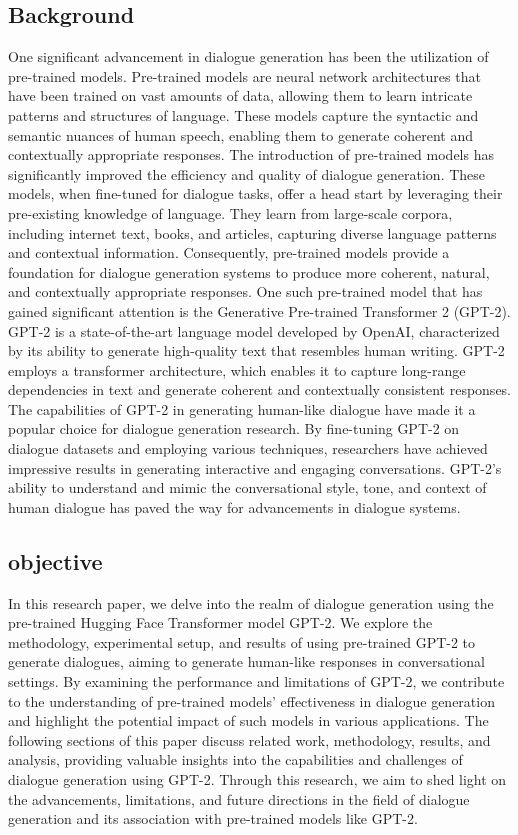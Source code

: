 \documentclass[12pt]{IEEEtran}
\begin{document}
\subsection{Background}
One significant advancement in dialogue generation has been the utilization of pre-trained models. Pre-trained models are neural network architectures that have been trained on vast amounts of data, allowing them to learn intricate patterns and structures of language. These models capture the syntactic and semantic nuances of human speech, enabling them to generate coherent and contextually appropriate responses. The introduction of pre-trained models has significantly improved the efficiency and quality of dialogue generation. These models, when fine-tuned for dialogue tasks, offer a head start by leveraging their pre-existing knowledge of language. They learn from large-scale corpora, including internet text, books, and articles, capturing diverse language patterns and contextual information. Consequently, pre-trained models provide a foundation for dialogue generation systems to produce more coherent, natural, and contextually appropriate responses.
One such pre-trained model that has gained significant attention is the Generative Pre-trained Transformer 2 (GPT-2). GPT-2 is a state-of-the-art language model developed by OpenAI, characterized by its ability to generate high-quality text that resembles human writing. GPT-2 employs a transformer architecture, which enables it to capture long-range dependencies in text and generate coherent and contextually consistent responses.
The capabilities of GPT-2 in generating human-like dialogue have made it a popular choice for dialogue generation research. By fine-tuning GPT-2 on dialogue datasets and employing various techniques, researchers have achieved impressive results in generating interactive and engaging conversations. GPT-2's ability to understand and mimic the conversational style, tone, and context of human dialogue has paved the way for advancements in dialogue systems.
\subsection{objective}
In this research paper, we delve into the realm of dialogue generation using the pre-trained Hugging Face Transformer model GPT-2. We explore the methodology, experimental setup, and results of using pre-trained GPT-2 to generate dialogues, aiming to generate human-like responses in conversational settings. By examining the performance and limitations of GPT-2, we contribute to the understanding of pre-trained models' effectiveness in dialogue generation and highlight the potential impact of such models in various applications.
The following sections of this paper discuss related work, methodology, results, and analysis, providing valuable insights into the capabilities and challenges of dialogue generation using GPT-2. Through this research, we aim to shed light on the advancements, limitations, and future directions in the field of dialogue generation and its association with pre-trained models like GPT-2.
\end{document}
